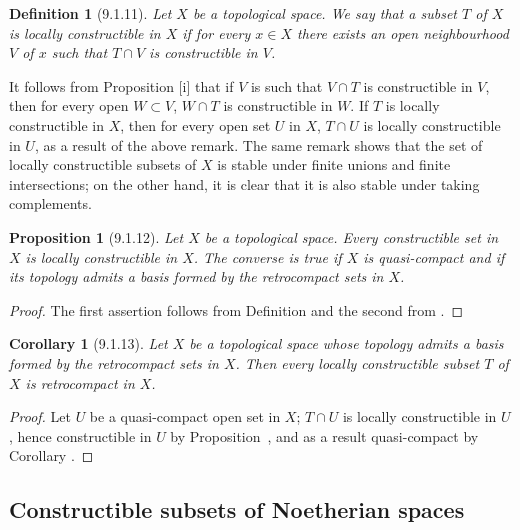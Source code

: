 \documentclass[oneside]{amsart}
\theoremstyle{ega-env-style}
\theoremstyle{ega-thm-env-style}
\newtheorem*{proposition}{Proposition}
\newtheorem*{corollary}{Corollary}
\theoremstyle{ega-defn-env-style}
\newtheorem*{definition}{Definition}
\let\EGAOriginalLabel\label
\renewcommand{\label}[1]{\phantomsection\EGAOriginalLabel{#1}}
\begin{document}
\begin{definition}[9.1.11]
\label{0.9.1.11}
Let $X$ be a topological space.
We say that a subset $T$ of $X$ is \emph{locally constructible} in $X$ if for every $x\in X$ there exists an open neighbourhood $V$ of $x$ such that $T\cap V$ is constructible in $V$.
\end{definition}

It follows from Proposition [i] that if $V$ is such that $V\cap T$ is constructible in $V$, then for every open $W\subset V$, $W\cap T$ is constructible in $W$.
If $T$ is locally constructible in $X$, then for every open set $U$ in $X$, $T\cap U$ is locally constructible in $U$, as a result of the above remark.
The same remark shows that the set of locally constructible subsets of $X$ is stable under finite unions and finite intersections; on the other hand, it is clear that it is also stable under taking complements.

\begin{proposition}[9.1.12]
\label{0.9.1.12}
Let $X$ be a topological space.
Every constructible set in $X$ is locally constructible in $X$.
The converse is true if $X$ is quasi-compact and if its topology admits a basis formed by the retrocompact sets in $X$.
\end{proposition}

\begin{proof}
The first assertion follows from Definition  and the second from .
\end{proof}

\begin{corollary}[9.1.13]
\label{0.9.1.13}
Let $X$ be a topological space whose topology admits a basis formed by the retrocompact sets in $X$.
Then every locally constructible subset $T$ of $X$ is retrocompact in $X$.
\end{corollary}

\begin{proof}
Let $U$ be a quasi-compact open set in $X$; $T\cap U$ is locally constructible in $U$, hence constructible in $U$ by Proposition~, and as a result quasi-compact by Corollary .
\end{proof}

\subsection{Constructible subsets of Noetherian spaces}
\label{subsection:0.9.2}
\end{document}
